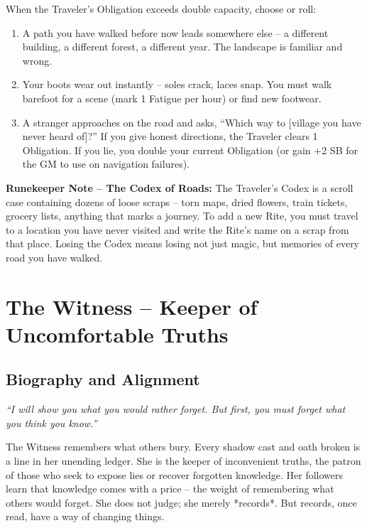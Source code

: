 \documentclass[10pt,a5paper]{book}
\begin{document}
When the Traveler’s Obligation exceeds double capacity, choose or roll:
\begin{enumerate}
    \item A path you have walked before now leads somewhere else – a different building, a different forest, a different year. The landscape is familiar and wrong.
    \item Your boots wear out instantly – soles crack, laces snap. You must walk barefoot for a scene (mark 1 Fatigue per hour) or find new footwear.
    \item A stranger approaches on the road and asks, “Which way to [village you have never heard of]?” If you give honest directions, the Traveler clears 1 Obligation. If you lie, you double your current Obligation (or gain +2 SB for the GM to use on navigation failures).
\end{enumerate}

\noindent \textbf{Runekeeper Note – The Codex of Roads:}
The Traveler’s Codex is a scroll case containing dozens of loose scraps – torn maps, dried flowers, train tickets, grocery lists, anything that marks a journey. To add a new Rite, you must travel to a location you have never visited and write the Rite’s name on a scrap from that place. Losing the Codex means losing not just magic, but memories of every road you have walked.

\clearpage

\section{The Witness – Keeper of Uncomfortable Truths}
\label{patron:witness}

\subsection*{Biography and Alignment}

\textit{“I will show you what you would rather forget. But first, you must forget what you think you know.”}

The Witness remembers what others bury. Every shadow cast and oath broken is a line in her unending ledger. She is the keeper of inconvenient truths, the patron of those who seek to expose lies or recover forgotten knowledge. Her followers learn that knowledge comes with a price – the weight of remembering what others would forget. She does not judge; she merely *records*. But records, once read, have a way of changing things.
\end{document}
